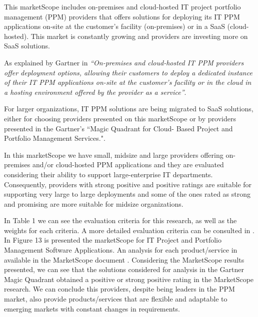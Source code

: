 This marketScope includes on-premises and cloud-hosted IT project portfolio management (PPM) providers that offers solutions for deploying its IT PPM applications on-site at the customer's facility (on-premises) or in a SaaS (cloud-hosted). This market is constantly growing and providers are investing more on SaaS solutions.\par
As explained by Gartner in \cite{MarketScopePPM} \textit{``On-premises and cloud-hosted IT PPM providers offer deployment options, allowing their customers to deploy a dedicated instance of their IT PPM applications on-site at the customer's facility or in the cloud in a hosting environment offered by the provider as a service''}.\par
For larger organizations, IT PPM solutions are being migrated to SaaS solutions, either for choosing providers presented on this marketScope or by providers presented in the Gartner's ``Magic Quadrant for Cloud- Based Project and Portfolio Management Services."\cite{magicQuadrantCloud}.\par
In this marketScope we have small, midsize and large providers offering on-premises and/or cloud-hosted PPM applications and they are evaluated considering their ability to support large-enterprise IT departments. Consequently, providers with strong positive and positive ratings are suitable for supporting very large to large deployments and some of the ones rated as strong and promising are more suitable for midsize organizations.\par
In Table 1 we can see the evaluation criteria for this research, as well as the weights for each criteria. A more detailed evaluation criteria can be consulted in \cite{MarketScopePPM}. In Figure 13 is presented the marketScope for IT Project and Portfolio Management Software Applications. An analysis for each product/service in available in the MarketScope document \cite{MarketScopePPM}.
Considering the MarketScope results presented, we can see that the solutions considered for analysis in the Gartner Magic Quadrant obtained a positive or strong positive rating in the MarketScope research. We can conclude this providers, despite being leaders in the PPM market, also provide products/services that are flexible and adaptable to emerging markets with constant changes in requirements.


